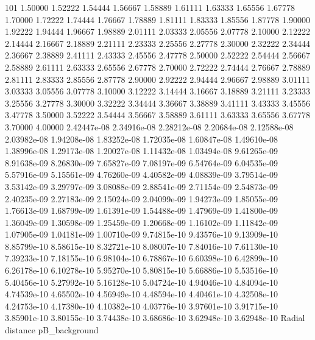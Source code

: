          101
      1.50000      1.52222      1.54444      1.56667      1.58889      1.61111
      1.63333      1.65556      1.67778      1.70000      1.72222      1.74444
      1.76667      1.78889      1.81111      1.83333      1.85556      1.87778
      1.90000      1.92222      1.94444      1.96667      1.98889      2.01111
      2.03333      2.05556      2.07778      2.10000      2.12222      2.14444
      2.16667      2.18889      2.21111      2.23333      2.25556      2.27778
      2.30000      2.32222      2.34444      2.36667      2.38889      2.41111
      2.43333      2.45556      2.47778      2.50000      2.52222      2.54444
      2.56667      2.58889      2.61111      2.63333      2.65556      2.67778
      2.70000      2.72222      2.74444      2.76667      2.78889      2.81111
      2.83333      2.85556      2.87778      2.90000      2.92222      2.94444
      2.96667      2.98889      3.01111      3.03333      3.05556      3.07778
      3.10000      3.12222      3.14444      3.16667      3.18889      3.21111
      3.23333      3.25556      3.27778      3.30000      3.32222      3.34444
      3.36667      3.38889      3.41111      3.43333      3.45556      3.47778
      3.50000      3.52222      3.54444      3.56667      3.58889      3.61111
      3.63333      3.65556      3.67778      3.70000      4.00000
  2.42447e-08  2.34916e-08  2.28212e-08  2.20684e-08  2.12588e-08  2.03982e-08
  1.94208e-08  1.83252e-08  1.72035e-08  1.60847e-08  1.49610e-08  1.38996e-08
  1.29173e-08  1.20027e-08  1.11432e-08  1.03494e-08  9.61265e-09  8.91638e-09
  8.26830e-09  7.65827e-09  7.08197e-09  6.54764e-09  6.04535e-09  5.57916e-09
  5.15561e-09  4.76260e-09  4.40582e-09  4.08839e-09  3.79514e-09  3.53142e-09
  3.29797e-09  3.08088e-09  2.88541e-09  2.71154e-09  2.54873e-09  2.40235e-09
  2.27183e-09  2.15024e-09  2.04099e-09  1.94273e-09  1.85055e-09  1.76613e-09
  1.68799e-09  1.61391e-09  1.54488e-09  1.47969e-09  1.41800e-09  1.36049e-09
  1.30598e-09  1.25459e-09  1.20668e-09  1.16102e-09  1.11842e-09  1.07905e-09
  1.04181e-09  1.00710e-09  9.74815e-10  9.43576e-10  9.13909e-10  8.85799e-10
  8.58615e-10  8.32721e-10  8.08007e-10  7.84016e-10  7.61130e-10  7.39233e-10
  7.18155e-10  6.98104e-10  6.78867e-10  6.60398e-10  6.42899e-10  6.26178e-10
  6.10278e-10  5.95270e-10  5.80815e-10  5.66886e-10  5.53516e-10  5.40456e-10
  5.27992e-10  5.16128e-10  5.04724e-10  4.94046e-10  4.84094e-10  4.74539e-10
  4.65502e-10  4.56949e-10  4.48594e-10  4.40461e-10  4.32508e-10  4.24753e-10
  4.17380e-10  4.10382e-10  4.03776e-10  3.97601e-10  3.91715e-10  3.85901e-10
  3.80155e-10  3.74438e-10  3.68686e-10  3.62948e-10  3.62948e-10
Radial distance       pB_background

